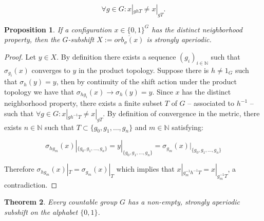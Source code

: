 \documentclass[letterpaper]{article}
\theoremstyle{plain}
\newtheorem{theorem}{Theorem}[section]
\newtheorem{proposition}[theorem]{Proposition}
\def\NN{\mathbb{N}}
\begin{document}
	$$\forall g \in G : x|_{ghT} \neq x|_{gT}.$$
	
	\begin{proposition}
		If a configuration $x \in \{0,1\}^G$ has the distinct neighborhood property, then the $G$-subshift $X := \overline{orb_\sigma(x)}$ is strongly aperiodic.
	\end{proposition}
	
	\begin{proof}
		
		Let $y \in X$. By definition there exists a sequence $(g_i)_{i \in \NN}$ such that $\sigma_{g_i}(x)$ converges to $y$ in the product topology. Suppose there is $h \neq 1_G$ such that $\sigma_h(y) = y$, then by continuity of the shift action under the product topology we have that $\sigma_{hg_i}(x) \to \sigma_{h}(y) = y$. Since $x$ has the distinct neighborhood property, there exists a finite subset $T$ of $G$ -- associated to $h^{-1}$ -- such that $\forall g \in G : x|_{gh^{-1}T} \neq x|_{gT}$. By definition of convergence in the metric, there exists $n \in \NN$ such that $T \subset \{g_0, g_1, \dots, g_n\}$ and $m \in \NN$ satisfying:
		
		$$\sigma_{hg_m}(x)|_{\{g_0, g_1, \dots, g_n\}} = y|_{\{g_0, g_1, \dots, g_n\}} = \sigma_{g_m}(x)|_{\{g_0, g_1, \dots, g_n\}}$$
		
		Therefore $\sigma_{hg_m}(x)|_T = \sigma_{g_m}(x)|_T$ which implies that $x|_{g_m^{-1}h^{-1}T} = x|_{g_m^{-1}T}$, a contradiction.	\end{proof}
	
	\begin{theorem}
		\label{theorem.free_subflow}
		Every countable group $G$ has a non-empty, strongly aperiodic subshift on the alphabet $\{0,1\}$.
	\end{theorem}
	
\end{document}
